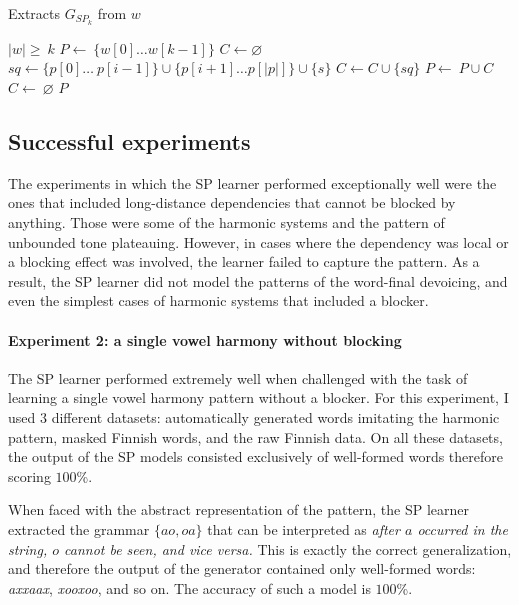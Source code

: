 \begin{algorithm}[h!]
\caption{Extracts $G_{SP_k}$ from $w$}
\begin{algorithmic}
\REQUIRE $|w| \geq~ k$
\STATE $P \leftarrow~ \{w[0] \dots w[k-1]\}$
\STATE $C \leftarrow \varnothing$
			\STATE $sq \leftarrow \{p[0]\dots~p[i-1]\} \cup \{p[i+1] \dots p[|p|]\} \cup \{s\}$
			\STATE $C \leftarrow C \cup \{sq\}$
		\ENDFOR
	\ENDFOR
	\STATE $P \leftarrow~ P \cup C$
	\STATE $C \leftarrow~ \varnothing$
\ENDFOR
\RETURN $P$
\end{algorithmic}
\end{algorithm}


\subsection{Successful experiments}

The experiments in which the SP learner performed exceptionally well were the ones that included long-distance dependencies that cannot be blocked by anything.
Those were some of the harmonic systems and the pattern of unbounded tone plateauing.
However, in cases where the dependency was local or a blocking effect was involved, the learner failed to capture the pattern.
As a result, the SP learner did not model the patterns of the word-final devoicing, and even the simplest cases of harmonic systems that included a blocker.

\paragraph{Experiment 2: a single vowel harmony without blocking}

The SP learner performed extremely well when challenged with the task of learning a single vowel harmony pattern without a blocker.
For this experiment, I used $3$ different datasets: automatically generated words imitating the harmonic pattern, masked Finnish words, and the raw Finnish data.
On all these datasets, the output of the SP models consisted exclusively of well-formed words therefore scoring $100$\%.

When faced with the abstract representation of the pattern, the SP learner extracted the grammar $\{ao, oa\}$ that can be interpreted as \emph{after $a$ occurred in the string, $o$ cannot be seen, and vice versa.}
This is exactly the correct generalization, and therefore the output of the generator contained only well-formed words: \emph{axxaax}, \emph{xooxoo}, and so on.
The accuracy of such a model is $100$\%.

